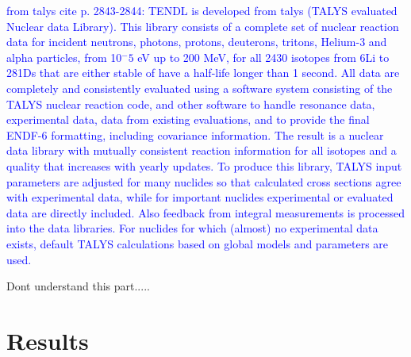 \documentclass[a4paper,11pt,twoside]{book}
\begin{document}
\textcolor{blue}{from talys cite p. 2843-2844: TENDL is developed from talys (TALYS evaluated Nuclear data Library).  This
library consists of a complete set of nuclear reaction data
for incident neutrons, photons, protons, deuterons, tritons, Helium-3 and alpha particles, from 10$^−5$ eV up to 200 MeV, for all 2430 isotopes from 6Li to 281Ds that are either stable of have a half-life longer than 1 second.
All data are completely and consistently evaluated using a software system consisting of the TALYS nuclear reaction code, and other software to handle resonance data, experimental data, data from existing evaluations,
and to provide the final ENDF-6 formatting, including
covariance information. The result is a nuclear data library with mutually consistent reaction information for
all isotopes and a quality that increases with yearly updates.  To produce this library, TALYS input parameters are
adjusted for many nuclides so that calculated cross sections agree with experimental data, while for important
nuclides experimental or evaluated data are directly included. Also feedback from integral measurements is
processed into the data libraries. For nuclides for which
(almost) no experimental data exists, default TALYS
calculations based on global models and parameters are
used.}


Dont understand this part..... 


\chapter{Results}
\end{document}
